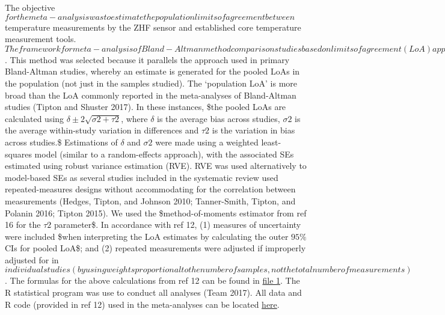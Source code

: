 \documentclass[smallextended]{svjour3}       %
\begin{document}
The objective
\(for the meta-analysis was to estimate the population limits of agreement between\)
temperature measurements by the ZHF sensor and established core
temperature measurement tools.
\(The framework for meta-analysis of Bland-Altman method comparison studies based on limits of agreement (LoA) approach was used [@tipton2017framework]\).
This method was selected because it parallels the approach used in
primary Bland-Altman studies, whereby an estimate is generated for the
pooled LoAs in the population (not just in the samples studied). The
`population LoA' is more broad than the LoA commonly reported in the
meta-analyses of Bland-Altman studies (Tipton and Shuster 2017). In
these instances, \$the pooled LoAs are calculated using
\(\delta\pm2\sqrt{\sigma2+\tau2}\), where \(\delta\) is the average bias
across studies, \(\sigma2\) is the average within-study variation in
differences and \(\tau2\) is the variation in bias across studies.\$
Estimations of \(\delta\) and \(\sigma2\) were made using a weighted
least-squares model (similar to a random-effects approach), with the
associated SEs estimated using robust variance estimation (RVE). RVE was
used alternatively to model-based SEs as several studies included in the
systematic review used repeated-measures designs without accommodating
for the correlation between measurements (Hedges, Tipton, and Johnson
2010; Tanner-Smith, Tipton, and Polanin 2016; Tipton 2015). We used the
\$method-of-moments estimator from ref 16 for the \(\tau2\) parameter\$.
In accordance with ref 12, (1) measures of uncertainty were included
\$when interpreting the LoA estimates by calculating the outer \(95\%\)
CIs for pooled LoA\$; and (2) repeated measurements were adjusted if
improperly adjusted for in
\(individual studies (by using weights proportional to the number of samples, not the total number of measurements)\).
The formulas for the above calculations from ref 12 can be found in
\href{}{file 1}. The R statistical program was use to conduct all
analyses (Team 2017). All data and R code (provided in ref 12) used in
the meta-analyses can be located \href{https://doi.org}{here}.
\end{document}
